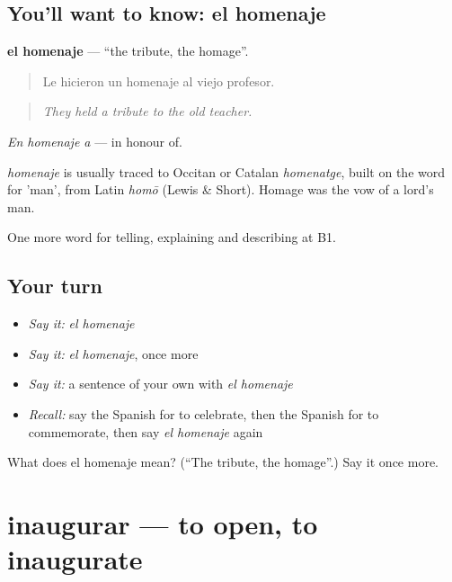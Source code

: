 \subsection*{You'll want to know: el homenaje}
\textbf{el homenaje} — \textquotedblleft{}the tribute, the homage\textquotedblright{}.

\begin{quote}
Le hicieron un homenaje al viejo profesor.
\end{quote}

\begin{quote}
\emph{They held a tribute to the old teacher.}
\end{quote}

\emph{En homenaje a} — in honour of.

\begin{cousinweb}
\emph{homenaje} is usually traced to Occitan or Catalan \emph{homenatge}, built on the word for 'man', from Latin \emph{homō} (Lewis \& Short). Homage was the vow of a lord's man.
\end{cousinweb}

\begin{grammarlens}[title={What you've built}]
One more word for telling, explaining and describing at B1.
\end{grammarlens}

\subsection*{Your turn}
\begin{itemize}
\raggedright
  \item \emph{Say it:} \emph{el homenaje}
  \item \emph{Say it:} \emph{el homenaje}, once more
  \item \emph{Say it:} a sentence of your own with \emph{el homenaje}
  \item \emph{Recall:} say the Spanish for to celebrate, then the Spanish for to commemorate, then say \emph{el homenaje} again
\end{itemize}

\begin{tcolorbox}[breakable,colback=teal!4,colframe=teal!35!black,title={Before you move on}]
What does el homenaje mean? (\textquotedblleft{}The tribute, the homage\textquotedblright{}.) Say it once more.
\end{tcolorbox}
\section[inaugurar]{inaugurar — to open, to inaugurate}

